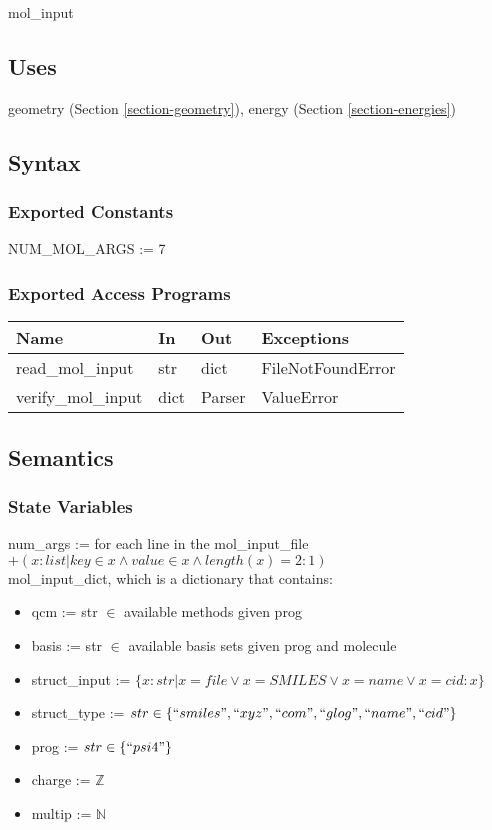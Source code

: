 \documentclass[12pt, titlepage]{article}
\begin{document}
mol\_input

\subsection{Uses}

geometry (Section \ref{section-geometry}), energy (Section 
\ref{section-energies})

\subsection{Syntax}

\subsubsection{Exported Constants}

NUM\_MOL\_ARGS := 7

\subsubsection{Exported Access Programs}

\begin{table}[H]
	\begin{tabular}{p{4cm} p{2cm} p{2cm} p{5cm}}
		\toprule
		\textbf{Name} & \textbf{In} & \textbf{Out} & \textbf{Exceptions} \\
		\hline
		read\_mol\_input   & str  & dict & FileNotFoundError \\
		verify\_mol\_input & dict & Parser & ValueError \\
		\bottomrule
	\end{tabular}
\end{table}

\subsection{Semantics}

\subsubsection{State Variables}

\noindent num\_args := for each line in the mol\_input\_file $+(x : list | key 
\in x \land value \in x \land 
length(x) = 2 : 1)$ \\

\noindent mol\_input\_dict, which is a dictionary that contains:
\begin{itemize}
	\item qcm := str $\in$ available methods given prog
	\item basis := str $\in$ available basis sets given prog and molecule
	\item struct\_input := $\{x : str | x = file \lor x = SMILES \lor x = name 
	\lor x = cid : x\}$
	\item struct\_type := $str \in \{``smiles", ``xyz", ``com", ``glog", 
	``name", ``cid"\} $
	\item prog := $str \in \{``psi4"\}$
	\item charge := $\mathbb{Z}$
	\item multip := $\mathbb{N}$
\end{itemize}
\end{document}

